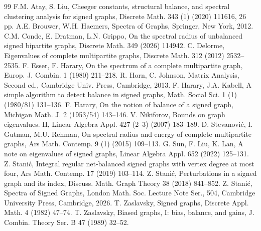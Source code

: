 \documentclass[10pt,a4paper]{amsart}
\numberwithin{equation}{section}
\begin{document}
\begin{thebibliography}{99}
 F.M. Atay, S. Liu, Cheeger constants, structural balance, and spectral clustering analysis for signed graphs, Discrete Math. 343 (1) (2020) 111616, 26 pp.
 A.E. Brouwer, W.H. Haemers, Spectra of Graphs, Springer, New York, 2012.
 C.M. Conde, E. Dratman, L.N. Grippo, On the spectral radius of unbalanced signed bipartite graphs, Discrete Math. 349 (2026) 114942.
 C. Delorme, Eigenvalues of complete multipartite graphs, Discrete Math. 312 (2012) 2532--2535.
 F. Esser, F. Harary, On the spectrum of a complete multipartite graph, Europ. J. Combin. 1 (1980) 211--218.
 R. Horn, C. Johnson, Matrix Analysis, Second ed., Cambridge Univ. Press, Cambridge, 2013.
 F. Harary, J.A. Kabell, A simple algorithm to detect balance in signed graphs, Math. Social Sci. 1 (1) (1980/81) 131--136.
 F. Harary, On the notion of balance of a signed graph, Michigan Math. J. 2 (1953/54) 143--146.
 V. Nikiforov, Bounds on graph eigenvalues. II, Linear Algebra Appl. 427 (2--3) (2007) 183--189.
 D. Stevanovi\'c, I. Gutman, M.U. Rehman, On spectral radius and energy of complete multipartite graphs, Ars Math. Contemp. 9 (1) (2015) 109--113.
 G. Sun, F. Liu, K. Lan, A note on eigenvalues of signed graphs, Linear Algebra Appl. 652 (2022) 125--131.
 Z. Stani\'c, Integral regular net-balanced signed graphs with vertex degree at most four, Ars Math. Contemp. 17 (2019) 103--114.
 Z. Stani\'c, Perturbations in a signed graph and its index, Discuss. Math. Graph Theory 38 (2018) 841--852.
 Z. Stani\'c, Spectra of Signed Graphs, London Math. Soc. Lecture Note Ser., 504, Cambridge University Press, Cambridge, 2026.
 T. Zaslavsky, Signed graphs, Discrete Appl. Math. 4 (1982) 47--74.
 T. Zaslavsky, Biased graphs, I: bias, balance, and gains, J. Combin. Theory Ser. B 47 (1989) 32--52.
\end{thebibliography}
\end{document}
